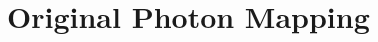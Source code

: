 \documentclass[main.tex]{subfiles}
\begin{document}
\section{Original Photon Mapping} \label{section:ppm_initial}

\end{document}
